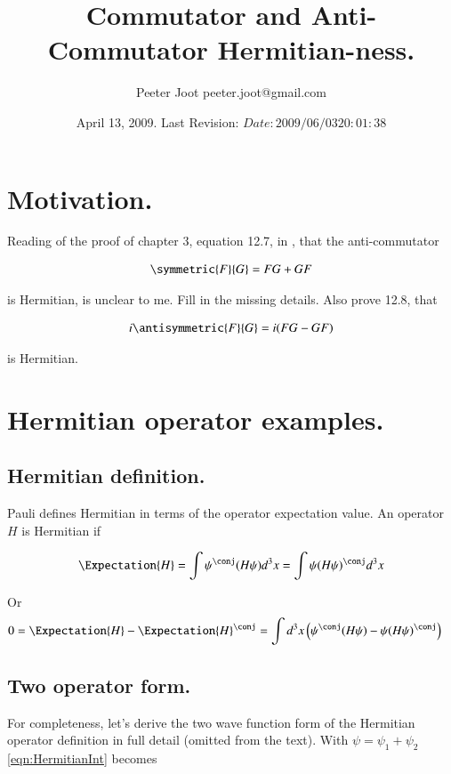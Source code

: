 \documentclass{article}
\title{ Commutator and Anti-Commutator Hermitian-ness. }
\author{Peeter Joot \quad peeter.joot@gmail.com }
\date{ April 13, 2009.  Last Revision: $Date: 2009/06/03 20:01:38 $ }
\begin{document}
\maketitle{}

\tableofcontents

\section{Motivation. }

Reading of the proof of chapter 3, equation 12.7, in \cite{pauli2000wm},
that the anti-commutator 

\begin{align*}
\symmetric{F}{G} = {F G + G F}
\end{align*}

is Hermitian, is unclear to me.  Fill in the missing details.  Also prove 12.8, that 

\begin{align*}
i \antisymmetric{F}{G} = i (F G - G F)
\end{align*}

is Hermitian.

\section{Hermitian operator examples. }

\subsection{Hermitian definition. }

Pauli defines Hermitian in terms of the operator expectation value.  An operator $H$ is Hermitian if

\begin{align}\label{eqn:Hermitian}
\Expectation{H} = \int \psi^\conj (H \psi) d^3 x = \int \psi (H \psi)^\conj d^3 x
\end{align}

Or
\begin{align}\label{eqn:HermitianInt}
0 &= \Expectation{H} - \Expectation{H}^\conj = \int d^3 x \left( \psi^\conj (H \psi) - \psi (H \psi)^\conj \right)
\end{align}

\subsection{Two operator form. }

For completeness, let's derive the two wave function form of the Hermitian operator definition in full detail (omitted from the text).  With $\psi = \psi_1 + \psi_2$
\ref{eqn:HermitianInt} becomes
\end{document}
